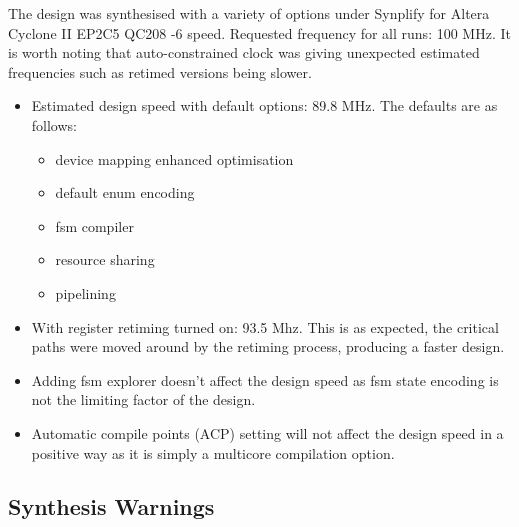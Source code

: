 \documentclass[]{article}
\begin{document}
The design was synthesised with a variety of options under Synplify for Altera Cyclone II EP2C5 QC208 -6 speed. Requested frequency for all runs: 100 MHz. It is worth noting that auto-constrained clock was giving unexpected estimated frequencies such as retimed versions being slower.
\begin{itemize}
	\item Estimated design speed with default options: 89.8 MHz. The defaults are as follows:

\begin{itemize}
	\item device mapping enhanced optimisation
	\item default enum encoding
	\item fsm compiler
	\item resource sharing
	\item pipelining


\end{itemize}

	
\item With register retiming turned on: 93.5 Mhz. This is as expected, the critical paths were moved around by the retiming process, producing a faster design.

\item Adding fsm explorer doesn't affect the design speed as fsm state encoding is not the limiting factor of the design.

\item Automatic compile points (ACP) setting will not affect the design speed in a positive way as it is simply a multicore compilation option.

\end{itemize}

\label{sub:synthesis_option_space_exploration}


\subsection{Synthesis Warnings} %
\label{sub:synthesis_warnings}
\end{document}

